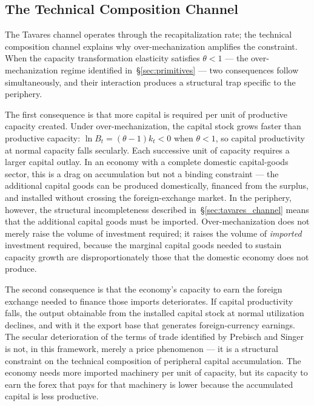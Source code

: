 \documentclass[12pt,letterpaper]{article}
\newcommand{\Bt}{B_t}              %
\begin{document}
\subsection{The Technical Composition Channel}
\label{sec:tech_composition}

The Tavares channel operates through the recapitalization rate; the technical
composition channel explains why over-mechanization amplifies the constraint.
When the capacity transformation elasticity satisfies $\theta < 1$ --- the
over-mechanization regime identified in~\S\ref{sec:primitives} --- two
consequences follow simultaneously, and their interaction produces a structural
trap specific to the periphery.

The first consequence is that more capital is required per unit of productive
capacity created. Under over-mechanization, the capital stock grows faster than
productive capacity: $\ln\Bt = (\theta - 1)k_t < 0$ when $\theta < 1$, so
capital productivity at normal capacity falls secularly. Each successive unit
of capacity requires a larger capital outlay. In an economy with a complete
domestic capital-goods sector, this is a drag on accumulation but not a binding
constraint --- the additional capital goods can be produced domestically,
financed from the surplus, and installed without crossing the foreign-exchange
market. In the periphery, however, the structural incompleteness described
in~\S\ref{sec:tavares_channel} means that the additional capital goods must be
imported. Over-mechanization does not merely raise the volume of investment
required; it raises the volume of \emph{imported} investment required, because
the marginal capital goods needed to sustain capacity growth are
disproportionately those that the domestic economy does not produce.

The second consequence is that the economy's capacity to earn the foreign
exchange needed to finance those imports deteriorates. If capital productivity
falls, the output obtainable from the installed capital stock at normal
utilization declines, and with it the export base that generates
foreign-currency earnings. The secular deterioration of the terms of trade
identified by Prebisch and Singer is not, in this framework, merely a price
phenomenon --- it is a structural constraint on the technical composition of
peripheral capital accumulation. The economy needs more imported machinery per
unit of capacity, but its capacity to earn the forex that pays for that
machinery is lower because the accumulated capital is less productive.
\end{document}
